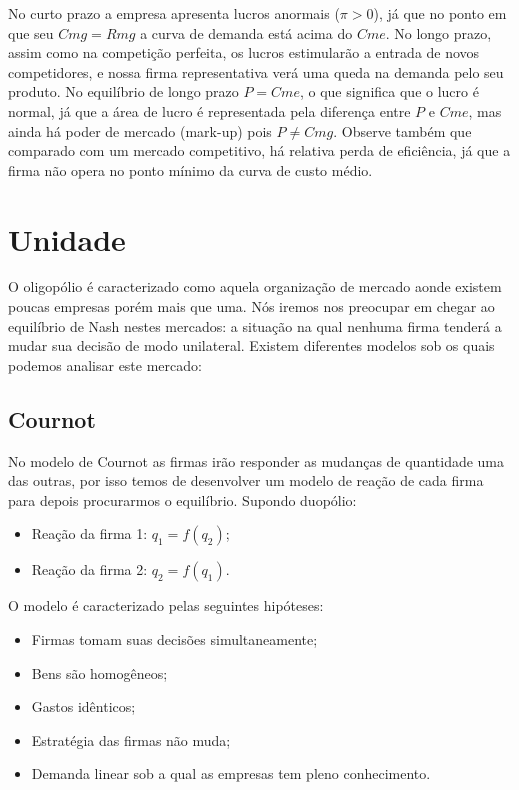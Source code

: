 \documentclass[12pt,a4paper,oneside,brazil]{abntex2}
\begin{document}
No curto prazo a empresa apresenta lucros anormais ($\pi > 0$), já que no ponto em que seu $Cmg = Rmg$  a curva de demanda está acima do $Cme$. No longo prazo, assim como na competição perfeita, os lucros estimularão a entrada de novos competidores, e nossa firma representativa verá uma queda na demanda pelo seu produto. No equilíbrio de longo prazo $P = Cme$, o que significa que o lucro é normal, já que a área de lucro é representada pela diferença entre $P$ e $Cme$, mas ainda há poder de mercado (mark-up) pois $ P \neq Cmg$. Observe também que comparado com um mercado competitivo, há relativa perda de eficiência, já que a firma não opera no ponto mínimo da curva de custo médio.

\chapter{Unidade}
O oligopólio é caracterizado como aquela organização de mercado aonde existem poucas empresas porém mais que uma. Nós iremos nos preocupar em chegar ao equilíbrio de Nash nestes mercados: a situação na qual nenhuma firma tenderá a mudar sua decisão de modo unilateral. Existem diferentes modelos sob os quais podemos analisar este mercado:

\section{Cournot}
No modelo de Cournot as firmas irão responder as mudanças de quantidade uma das outras, por isso temos de desenvolver um modelo de reação de cada firma para depois procurarmos o equilíbrio. Supondo duopólio:

\begin{itemize}
\item Reação da firma 1: $q_1 = f(q_2)$;
\item Reação da firma 2: $q_2 = f(q_1)$.
\end{itemize}

O modelo é caracterizado pelas seguintes hipóteses:
\begin{itemize}
\item Firmas tomam suas decisões simultaneamente; 
\item Bens são homogêneos;
\item Gastos idênticos;
\item Estratégia das firmas não muda;
\item Demanda linear sob a qual as empresas tem pleno conhecimento.
\end{itemize}
\end{document}

